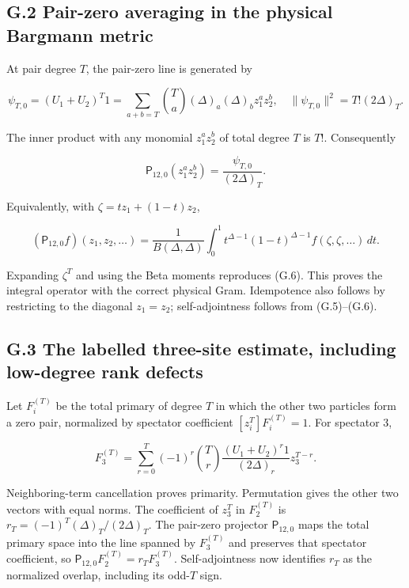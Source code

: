 \hypertarget{g.2-pair-zero-averaging-in-the-physical-bargmann-metric}{%
\subsection{G.2 Pair-zero averaging in the physical Bargmann metric}\label{g.2-pair-zero-averaging-in-the-physical-bargmann-metric}}

At pair degree \(T\), the pair-zero line is generated by

\[
\psi_{T,0}=(U_1+U_2)^T1
=\sum_{a+b=T}\binom Ta(\Delta)_a(\Delta)_b z_1^az_2^b,
\quad\|\psi_{T,0}\|^2=T!(2\Delta)_T.
\tag{G.5}
\]

The inner product with any monomial \(z_1^az_2^b\) of total degree \(T\) is \(T!\). Consequently

\[
\mathsf P_{12,0}(z_1^az_2^b)=\frac{\psi_{T,0}}{(2\Delta)_T}.
\tag{G.6}
\]

Equivalently, with \(\zeta=tz_1+(1-t)z_2\),

\[
(\mathsf P_{12,0}f)(z_1,z_2,\ldots)
=\frac1{B(\Delta,\Delta)}\int_0^1t^{\Delta-1}(1-t)^{\Delta-1}
f(\zeta,\zeta,\ldots)\,dt.
\tag{G.7}
\]

Expanding \(\zeta^T\) and using the Beta moments reproduces (G.6). This proves the integral operator with the correct physical Gram. Idempotence also follows by restricting to the diagonal \(z_1=z_2\); self-adjointness follows from (G.5)--(G.6).

\hypertarget{g.3-the-labelled-three-site-estimate-including-low-degree-rank-defects}{%
\subsection{G.3 The labelled three-site estimate, including low-degree rank defects}\label{g.3-the-labelled-three-site-estimate-including-low-degree-rank-defects}}

Let \(F_i^{(T)}\) be the total primary of degree \(T\) in which the other two particles form a zero pair, normalized by spectator coefficient \([z_i^T]F_i^{(T)}=1\). For spectator 3,

\[
F_3^{(T)}=\sum_{r=0}^T(-1)^r\binom Tr
\frac{(U_1+U_2)^r1}{(2\Delta)_r}z_3^{T-r}.
\tag{G.8}
\]

Neighboring-term cancellation proves primarity. Permutation gives the other two vectors with equal norms. The coefficient of \(z_3^T\) in \(F_2^{(T)}\) is \(r_T=(-1)^T(\Delta)_T/(2\Delta)_T\). The pair-zero projector \(\mathsf P_{12,0}\) maps the total primary space into the line spanned by \(F_3^{(T)}\) and preserves that spectator coefficient, so \(\mathsf P_{12,0}F_2^{(T)}=r_TF_3^{(T)}\). Self-adjointness now identifies \(r_T\) as the normalized overlap, including its odd-\(T\) sign.

